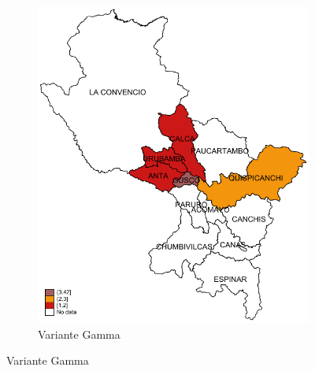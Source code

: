 \documentclass[12pt,a4paper,openany]{book}
\begin{document}
\begin{figure}[h]
\begin{subfigure}[b]{0.40\textwidth}
					\includegraphics[width=\textwidth]{../figuras/variantes_provincial_gamma.pdf}
					\caption{Variante Gamma}
				\end{subfigure}
				

\end{figure}
\end{document}
